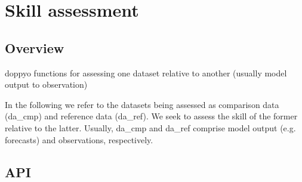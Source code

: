 \documentclass[letterpaper,10pt,english]{sphinxmanual}
\begin{document}
\section{Skill assessment}
\label{\detokenize{skill_doc:module-skill}}\label{\detokenize{skill_doc:skill-assessment}}\label{\detokenize{skill_doc::doc}}

\subsection{Overview}
\label{\detokenize{skill_doc:overview}}
doppyo functions for assessing one dataset relative to another (usually model output to observation)

In the following we refer to the datasets being assessed as comparison data (da\_cmp) and reference
data (da\_ref). We seek to assess the skill of the former relative to the latter. Usually, da\_cmp
and da\_ref comprise model output (e.g. forecasts) and observations, respectively.


\subsection{API}
\label{\detokenize{skill_doc:api}}
\end{document}
